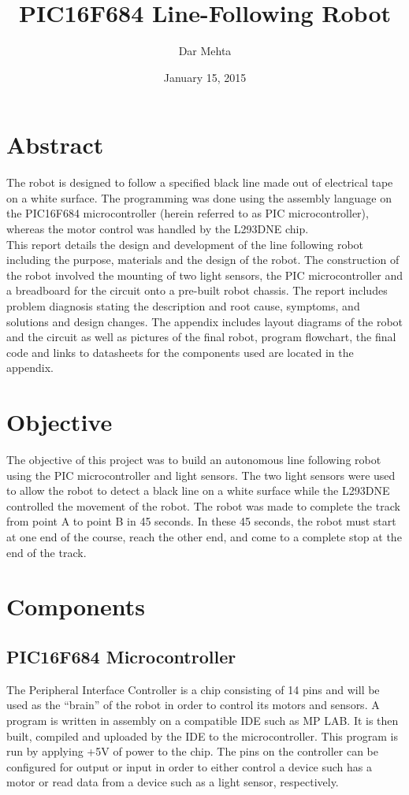 \documentclass[12pt]{article}
\title{PIC16F684 Line-Following Robot}
\author{Dar Mehta}
\date{January 15, 2015}
\begin{document}
\maketitle
\newpage
\tableofcontents
\newpage

\section{Abstract}	
The robot is designed to follow a specified black line made out of electrical tape on a white surface. The programming was done using the assembly language on the PIC16F684 microcontroller (herein referred to as PIC microcontroller), whereas the motor control was handled by the L293DNE chip.
\\[\baselineskip]
This report details the design and development of the line following robot including the purpose, materials and the design of the robot. The construction of the robot involved the mounting of two light sensors, the PIC microcontroller and a breadboard for the circuit onto a pre-built robot chassis. The report includes problem diagnosis stating the description and root cause, symptoms, and solutions and design changes. The appendix includes layout diagrams of the robot and the circuit as well as pictures of the final robot, program flowchart, the final code and links to datasheets for the components used are located in the appendix.

\section{Objective}
The objective of this project was to build an autonomous line following robot using the PIC microcontroller and light sensors. The two light sensors were used to allow the robot to detect a black line on a white surface while the L293DNE controlled the movement of the robot. The robot was made to complete the track from point A to point B in 45 seconds. In these 45 seconds, the robot must start at one end of the course, reach the other end, and come to a complete stop at the end of the track.

\section{Components}
\subsection{PIC16F684 Microcontroller}
The Peripheral Interface Controller is a chip consisting of 14 pins and will be used as the “brain” of the robot in order to control its motors and sensors. A program is written in assembly on a compatible IDE such as MP LAB. It is then built, compiled and uploaded by the IDE to the microcontroller. This program is run by applying +5V of power to the chip. The pins on the controller can be configured for output or input in order to either control a device such has a motor or read data from a device such as a light sensor, respectively.
\end{document}
